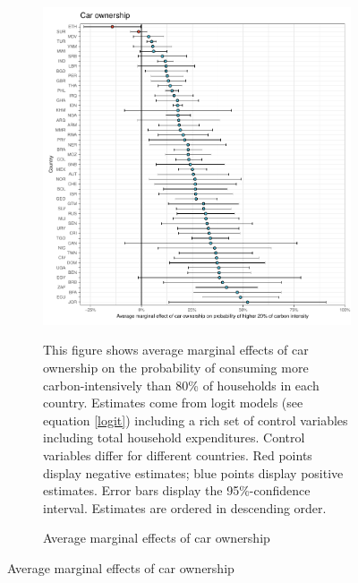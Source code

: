  \begin{figure}[ht!]\ContinuedFloat
   \centering
   \begin{subfigure}[b]{\textwidth}
   \centering
   \includegraphics{1_Figures/Analysis_Logit_Models_Marginal_Effects/Average_Marginal_Effects_affected_upper_80_car.01_2017B.pdf}
   \caption{Average marginal effects of car ownership} \label{fig:Logit_ME_car}
   \begin{subcaption2}
     This figure shows average marginal effects of car ownership on the probability of consuming more carbon-intensively than 80\% of households in each country. Estimates come from logit models (see equation \ref{logit}) including a rich set of control variables including total household expenditures. Control variables differ for different countries. Red points display negative estimates; blue points display positive estimates. Error bars display the 95\%-confidence interval. Estimates are ordered in descending order.
   \end{subcaption2}
   \end{subfigure}
 \end{figure}
 \clearpage

